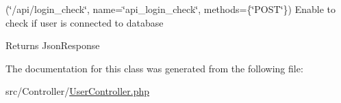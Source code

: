 (\char`\"{}/api/login\+\_\+check\char`\"{}, name=\char`\"{}api\+\_\+login\+\_\+check\char`\"{}, methods=\{\char`\"{}\+P\+O\+S\+T\char`\"{}\}) Enable to check if user is connected to database

\begin{DoxyReturn}{Returns}
Json\+Response 
\end{DoxyReturn}


The documentation for this class was generated from the following file\+:\begin{DoxyCompactItemize}
\item 
src/\+Controller/\mbox{\hyperlink{_user_controller_8php}{User\+Controller.\+php}}\end{DoxyCompactItemize}
